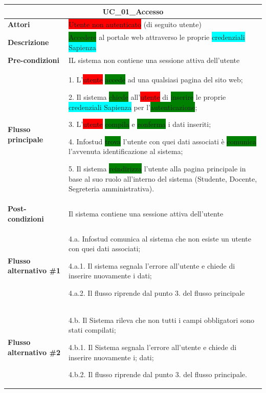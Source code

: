 \documentclass[11pt]{article}
\begin{document}
\begin{table}[H]
\centering
\begin{tabularx}{1\textwidth}{|l|X|}
\hline
\multicolumn{2}{|c|}{\textbf{UC\_01\_Accesso}}\\
\hline \textbf{Attori} & \colorbox{red}{Utente non autenticato} (di seguito utente)\\
\hline \textbf{Descrizione} & \colorbox{green}{Accedere} al portale web attraverso le proprie \colorbox{cyan}{credenziali Sapienza}\\
\hline \textbf{Pre-condizioni} & IL sistema non contiene una sessione attiva dell'utente\\
\hline \textbf{Flusso principale} &
1. L'\colorbox{red}{utente} \colorbox{green}{accede} ad una qualsiasi pagina del sito web;

2. Il sistema \colorbox{green}{chiede} all'\colorbox{red}{utente} di \colorbox{green}{inserire} le proprie \colorbox{cyan}{credenziali Sapienza} per l'\colorbox{green}{autenticazione};

3. L'\colorbox{red}{utente} \colorbox{green}{compila} e \colorbox{green}{conferma} i dati inseriti;

4. Infostud \colorbox{green}{trova} l'utente con quei dati associati è \colorbox{green}{comunica} l'avvenuta identificazione al sistema;

5. Il sistema \colorbox{green}{reindirizza} l'utente alla pagina principale in base al
suo ruolo all'interno del sistema (Studente, Docente,
Segreteria amministrativa).
\\
\hline \textbf{Post-condizioni} & Il sistema contiene una sessione attiva dell'utente\\
\hline \textbf{Flusso alternativo \#1} & 
4.a. Infostud comunica al sistema che non esiste un utente con quei dati associati;

4.a.1. Il sistema segnala l'errore all'utente e chiede di inserire nuovamente i dati;

4.a.2. Il flusso riprende dal punto 3. del flusso principale
\\
\hline \textbf{Flusso alternativo \#2} & 
4.b. Il Sistema rileva che non tutti i campi obbligatori sono stati compilati;

4.b.1. Il Sistema segnala l'errore all'utente e chiede di inserire nuovamente i;
dati;

4.b.2. Il flusso riprende dal punto 3. del flusso principale.
\\
\hline
\end{tabularx}

\end{table}
\end{document}
